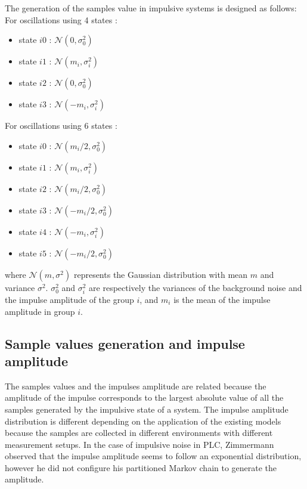 \documentclass[journal]{IEEEtran}
\begin{document}
The generation of the samples value in impulsive systems is designed as follows:\\
For oscillations using 4 states :
\begin{itemize}
  \item state $i0$ :  $\mathcal{N}(0,\sigma^2_0)$
  \item state $i1$ :  $\mathcal{N}(m_i,\sigma^2_i)$
  \item state $i2$ :  $\mathcal{N}(0,\sigma^2_0)$
  \item state $i3$ :  $\mathcal{N}(-m_i,\sigma^2_i)$
\end{itemize}
For oscillations using 6 states :
\begin{itemize}
  \item state $i0$ :  $\mathcal{N}(m_i/2,\sigma^2_0)$
  \item state $i1$ :  $\mathcal{N}(m_i,\sigma^2_i)$
  \item state $i2$ :  $\mathcal{N}(m_i/2,\sigma^2_0)$
  \item state $i3$ :  $\mathcal{N}(-m_i/2,\sigma^2_0)$
  \item state $i4$ :  $\mathcal{N}(-m_i,\sigma^2_i)$
  \item state $i5$ :  $\mathcal{N}(-m_i/2,\sigma^2_0)$
\end{itemize}
where $\mathcal{N}(m,\sigma^2)$ represents the Gaussian distribution with mean $m$ and variance $\sigma^2$. $\sigma_0^2$ and $\sigma_i^2$ are respectively the variances of the background noise and the impulse amplitude of the group $i$, and $m_i$ is the mean of the impulse amplitude in group $i$.
\subsection{Sample values generation and impulse amplitude}
The samples values and the impulses amplitude are related because the amplitude of the impulse corresponds to the largest absolute value of all the samples generated by the impulsive state of a system. The impulse amplitude distribution is different depending on the application of the existing models because the samples are collected in different environments with different measurement setups. In the case of impulsive noise in PLC, Zimmermann~\cite{zimmermann} observed that the impulse amplitude seems to follow an exponential distribution, however he did not configure his partitioned Markov chain to generate the amplitude.\
\end{document}

